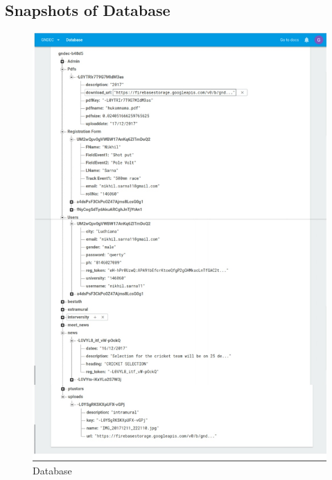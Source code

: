 \subsection{Snapshots of Database}
\begin{figure}[ht]
		\centering
		\includegraphics[scale=0.30]{images/dbfire.jpg}
		\caption{Database}
	\end{figure}



